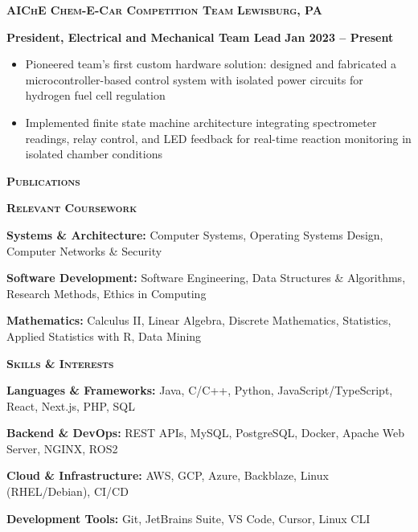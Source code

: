 \documentclass{article}
\newlength{\sectspaceabove}
\newlength{\sectspacebelow}
\newcommand{\textscbf}[1]{\textbf{\textsc{#1}}}
\newcommand{\resumesection}[1]{%
    \vspace{\sectspaceabove}%
    \begin{center}
        \textscbf{#1}
    \end{center}%
    \vspace{\sectspacebelow}%
}
\begin{document}
\textscbf{AIChE Chem-E-Car Competition Team} \hfill \textscbf{Lewisburg, PA}

\textbf{President, Electrical and Mechanical Team Lead} \hfill \textbf{Jan 2023 – Present}
\begin{itemize}[noitemsep,topsep=2pt]
	\item Pioneered team's first custom hardware solution: designed and fabricated a microcontroller-based control system with isolated power circuits for hydrogen fuel cell regulation
    \item Implemented finite state machine architecture integrating spectrometer readings, relay control, and LED feedback for real-time reaction monitoring in isolated chamber conditions
\end{itemize}

\resumesection{Publications}

\nocite{*}



\resumesection{Relevant Coursework}

\textbf{Systems \& Architecture:} Computer Systems, Operating Systems Design, Computer Networks \& Security

\textbf{Software Development:} Software Engineering, Data Structures \& Algorithms, Research Methods, Ethics in Computing

\textbf{Mathematics:} Calculus II, Linear Algebra, Discrete Mathematics, Statistics, Applied Statistics with R, Data Mining

\resumesection{Skills \& Interests}

\textbf{Languages \& Frameworks:} Java, C/C++, Python, JavaScript/TypeScript, React, Next.js, PHP, SQL

\textbf{Backend \& DevOps:} REST APIs, MySQL, PostgreSQL, Docker, Apache Web Server, NGINX, ROS2

\textbf{Cloud \& Infrastructure:} AWS, GCP, Azure, Backblaze, Linux (RHEL/Debian), CI/CD

\textbf{Development Tools:} Git, JetBrains Suite, VS Code, Cursor, Linux CLI
\end{document}
